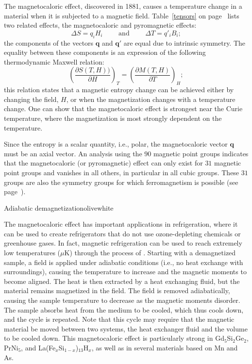 The magnetocaloric effect, discovered in 1881, causes a temperature change in a material when it is subjected to a magnetic field. Table~\ref{tensors} on page~\pageref{tensors} lists two related effects, the magnetocaloric and pyromagnetic effects:
\begin{equation}
	\Delta S = q_i H_i\qquad\text{ and }\qquad \Delta T = q'_i B_i;
\end{equation}
the components of the vectors $\mathbf{q}$ and $\mathbf{q}'$ are equal due to intrinsic symmetry.  The equality between these components is an expression of the following thermodynamic Maxwell relation:
\begin{equation}
	\left(\frac{\partial S(T,H))}{\partial H}\right)_T = \left(\frac{\partial M(T,H)}{\partial T}\right)_H;
\end{equation}
this relation states that a magnetic entropy change can be achieved either by changing the field, $H$, or when the magnetization changes with a temperature change.  One can show that the magnetocaloric effect is strongest near the Curie temperature, where the magnetization is most strongly dependent on the temperature.  

Since the entropy is a scalar quantity, i.e., polar, the magnetocaloric vector $\mathbf{q}$ must be an axial vector. An analysis using the $90$ magnetic point groups indicates that the magnetocaloric (or pyromagnetic) effect can only exist for $31$ magnetic point groups and vanishes in all others, in particular in all cubic groups. These $31$ groups are also the symmetry groups for which ferromagnetism is possible (see page~\pageref{tab:table1}). 

\begin{messagebox}{Adiabatic demagnetization}{olive}{\icinfo}{white}
\begin{minipage}{\textwidth}
The magnetocaloric effect has important applications in refrigeration, where it can be used to create refrigerators that do not use ozone-depleting chemicals or greenhouse gases.  In fact, magnetic refrigeration can be used to reach extremely low temperatures ($\mu$K) through the process of .  Starting with a demagnetized sample, a field is applied under adiabatic conditions (i.e., no heat exchange with surroundings), causing the temperature to increase and the magnetic moments to become aligned. The heat is then extracted by a heat exchanging fluid, but the material remains magnetized in the field. The field is removed adiabatically, causing the sample temperature to decrease as the magnetic moments disorder. The sample absorbs heat from the medium to be cooled, which thus cools down, and the cycle is repeated.  Note that this cycle may require that the magnetic material be moved between two systems, the heat exchanger fluid and the volume to be cooled down.  This magnetocaloric effect is particularly strong in Gd$_5$Si$_2$Ge$_2$, PrNi$_5$, and La(Fe$_x$Si$_{1-x}$)$_{13}$H$_x$, as well as in several materials based on Mn and As.
\end{minipage} 
\end{messagebox}

